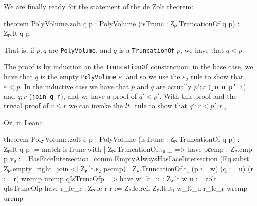 \documentclass[12pt]{article} %
\newcommand{\leanline}[1]{\texttt{#1}} %
\newcommand{\pvolume}{\texttt{PolyVolume}} %
\newcommand{\truncof}{\texttt{TruncationOf}} %
\begin{document}
We are finally ready for the statement of the de Zolt theorem: %
\begin{leancode}
theorem PolyVolume.zolt {q p : PolyVolume}
  (isTrunc : Zₚ.TruncationOf q p)
  : Zₚ.lt q p
\end{leancode}
That is, if \(p, q\) are \pvolume, and \(q\) is a \truncof{} \(p\), we have that \(q < p\). %

The proof is by induction on the \truncof{} construction: in the base case, we have that \(q\) is the empty \pvolume{} \(\varepsilon\), and so we use the
\(\varepsilon_2\) rule to show that \(\varepsilon < p\). %
In the inductive case we have that \(p\) and \(q\) are actually \(p';r\) (\leanline{join p' r}) and \(q;r\) (\leanline{join q r}), and we
have a proof of \(q' < p'\). %
With this proof and the trivial proof of \(r \leq r\) we can invoke the \(lt_1\) rule to show that \(q';r < p';r\;_\square\) %

Or, in Lean: %

\begin{leancode}
theorem PolyVolume.zolt {q p : PolyVolume}
  (isTrunc : Zₚ.TruncationOf q p)
  : Zₚ.lt q p :=
  match isTrunc with
  | Zₚ.TruncationOf.t₀ _ =>
      have pεcmp : Zₚ.cmp p v₀
        := HasFaceIntersection_comm EmptyAlwaysHasFaceIntersection
      (Eq.subst Zₚ.empty_right_join <| Zₚ.lt.ε₂ pεcmp)
  | Zₚ.TruncationOf.t₁ (p := w) (q := u) (r := r) wrcmp urcmp qIsTruncOfp =>
    have w_lt_u : Zₚ.lt w u := zolt qIsTruncOfp
    have r_le_r : Zₚ.le r r := Zₚ.le.refl
    Zₚ.lt.lt₁ w_lt_u r_le_r wrcmp urcmp
\end{leancode}

\printbibliography{}
\end{document}
